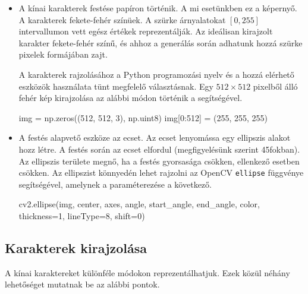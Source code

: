 \begin{itemize}
\item A kínai karakterek festése papíron történik. A mi esetünkben ez a képernyő. A karakterek fekete-fehér színüek. A szürke árnyalatokat $[0, 255]$ intervallumon vett egész értékek reprezentálják. Az ideálisan kirajzolt karakter fekete-fehér színű, és ahhoz a generálás során adhatunk hozzá szürke pixelek formájában zajt.

A karakterek rajzolásához a Python programozási nyelv és a hozzá elérhető eszközök használata tünt megfelelő választásnak. Egy $512 \times 512$ pixelből álló fehér kép kirajzolása az alábbi módon történik a segítségével.
\begin{python}
img = np.zeros((512, 512, 3), np.uint8)
img[0:512] = (255, 255, 255)
\end{python}

\item A festés alapvető eszköze az ecset. Az ecset lenyomássa egy ellipszis alakot hozz létre. A festés során az ecset elfordul (megfigyelésünk szerint 45fokban). Az ellipszis területe megnő, ha a festés gyorsasága csökken, ellenkező esetben csökken. Az ellipszist könnyedén lehet rajzolni az OpenCV \texttt{ellipse} függvénye segítségével, amelynek a paraméterezése a következő.
\begin{python}
cv2.ellipse(img, center, axes, angle, start_angle, 
	end_angle, color, thickness=1, lineType=8, shift=0) 
\end{python}
\end{itemize}

\subsection{Karakterek kirajzolása}

A kínai karaktereket különféle módokon reprezentálhatjuk. Ezek közül néhány lehetőséget mutatnak be az alábbi pontok.

